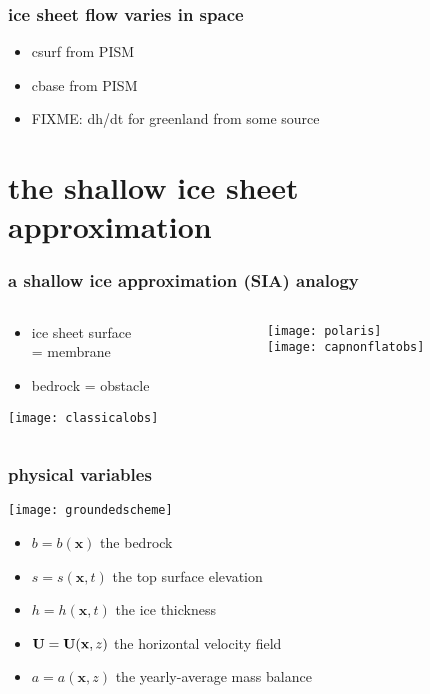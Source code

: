 \documentclass{beamer}
\newcommand{\bx}{\mathbf{x}}
\begin{document}
\begin{frame}
  \frametitle{ice sheet flow varies in space}

\small
\begin{itemize}
\item csurf from PISM
\item cbase from PISM
\item FIXME: dh/dt for greenland from some source
\end{itemize}

\end{frame}


\section[shallow ice approximation]{the shallow ice sheet approximation}


\begin{frame}
  \frametitle{a shallow ice approximation (SIA) analogy}

\begin{columns}
\begin{column}{0.35\textwidth}
\begin{itemize}
\item ice sheet surface \\ = \alert{membrane}
\item bedrock = \alert{obstacle}
\end{itemize}

\vfill
\begin{center}
\texttt{[image: classicalobs]}
\end{center}
\end{column}

\begin{column}{0.65\textwidth}
\begin{center}
\texttt{[image: polaris]} \\
\texttt{[image: capnonflatobs]}
\end{center}
\end{column}

\end{columns}
\end{frame}


\begin{frame}
  \frametitle{physical variables}

\begin{center}
\texttt{[image: groundedscheme]}
\end{center}

\begin{itemize}
\item $b=b(\bx)$ the bedrock
\item $s=s(\bx,t)$ the top surface elevation
\item $h=h(\bx,t)$ the ice thickness
\item ${\bf U}={\bf U}(\bx,z)$ the horizontal velocity field
\item $a=a(\bx,z)$ the yearly-average mass balance
\end{itemize}
\end{frame}
\end{document}
